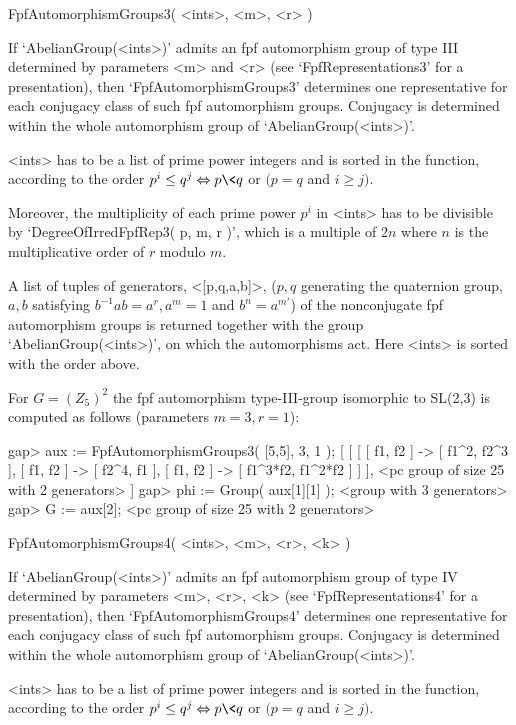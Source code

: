 \>FpfAutomorphismGroups3( <ints>, <m>, <r> )

If `AbelianGroup(<ints>)' admits an fpf automorphism group of
type III determined by parameters <m> and <r> (see 
`FpfRepresentations3' for a presentation), then
`FpfAutomorphismGroups3' determines one representative for each
conjugacy class of such fpf automorphism groups. Conjugacy is
determined within the whole automorphism group of `AbelianGroup(<ints>)'. 

<ints> has to be a list of prime power integers and is sorted in the
function, according to the order
$p^i\leq q^j \Leftrightarrow p \< q$ or $(p = q$ and $i\geq j)$. 

Moreover, the multiplicity of each prime power $p^i$ in <ints> has to be
divisible by `DegreeOfIrredFpfRep3( p, m, r )', which is a multiple
of $2n$ where $n$ is the multiplicative order of $r$ modulo $m$.

A list of tuples of generators, <[p,q,a,b]>, ($p,q$ generating the quaternion
group, $a,b$ satisfying $b^{-1}ab = a^r, a^m = 1$ and $b^n = a^{m'}$) of the
nonconjugate fpf automorphism groups is returned together with the group 
`AbelianGroup(<ints>)', on which the automorphisms act.
Here <ints> is sorted with the order above.

For $G = (Z_{5})^2$ the fpf automorphism type-III-group
isomorphic to SL(2,3) is computed as follows (parameters $m = 3, r = 1$):

\beginexample
    gap> aux := FpfAutomorphismGroups3( [5,5], 3, 1 ); 
    [ [ [ [ f1, f2 ] -> [ f1^2, f2^3 ], [ f1, f2 ] -> [ f2^4, f1 ], 
              [ f1, f2 ] -> [ f1^3*f2, f1^2*f2 ] ] ], 
      <pc group of size 25 with 2 generators> ]
    gap> phi := Group( aux[1][1] );
    <group with 3 generators>
    gap> G := aux[2];
    <pc group of size 25 with 2 generators>
\endexample

\>FpfAutomorphismGroups4( <ints>, <m>, <r>, <k> )

If `AbelianGroup(<ints>)' admits an fpf automorphism group of type IV 
determined by parameters <m>, <r>, <k> (see `FpfRepresentations4' for a 
presentation), then `FpfAutomorphismGroups4' determines one representative 
for each conjugacy class of such fpf automorphism groups. Conjugacy is
determined within the whole automorphism group of `AbelianGroup(<ints>)'. 

<ints> has to be a list of prime power integers and is sorted in the
function, according to the order
$p^i\leq q^j \Leftrightarrow p \< q$ or $(p = q$ and $i\geq j)$. 

